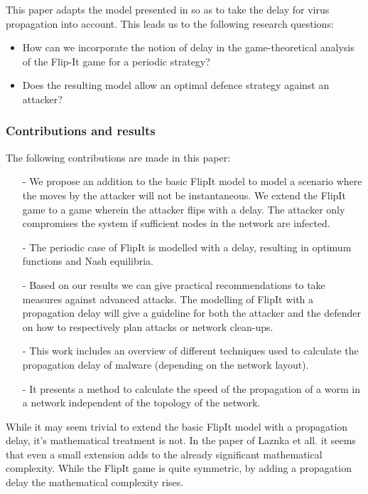 This paper adapts the model presented in \cite{FlipIt} so as to take the delay for virus propagation into account.
This leads us to the following research questions:
\begin{itemize}
\item How can we incorporate the notion of delay in the game-theoretical analysis of the Flip-It game for a periodic strategy?
\item Does the resulting model allow an optimal defence strategy against an attacker? 
\end{itemize}

\subsubsection{Contributions and results}
The following contributions are made in this paper:
\begin{itemize}
\item[-] We propose an addition to the basic FlipIt model to model a scenario where the moves by the attacker will not be instantaneous. We extend the FlipIt game to a game wherein the attacker flips with a delay. The attacker only compromises the system if sufficient nodes in the network are infected. 
\item[-] The periodic case of FlipIt is modelled with a delay, resulting in optimum functions and Nash equilibria. 
\item[-] Based on our results we can give practical recommendations to take measures against advanced attacks.  The modelling of FlipIt with a propagation delay will give a guideline for both the attacker and the defender on how to respectively plan attacks or network clean-ups.
\item[-] This work includes an overview of different techniques used to calculate the propagation delay of malware (depending on the network layout). 
\item[-] It presents a method to calculate the speed of the propagation of a worm in a network independent of the topology of the network.
\end{itemize}


While it may seem trivial to extend the basic FlipIt model with a propagation delay, it's mathematical treatment is not. In the paper of Laznka et all. \citep{FlipThem} it seems that even a small extension adds to the already significant mathematical complexity. While the FlipIt game is quite symmetric, by adding a propagation delay the mathematical complexity rises.

